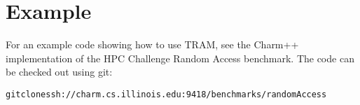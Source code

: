 \section{Example}

For an example code showing how to use TRAM, see the Charm++ implementation of
the HPC Challenge Random Access benchmark. The code can be checked out using
git:

\begin{alltt}
git clone  ssh://charm.cs.illinois.edu:9418/benchmarks/randomAccess
\end{alltt}

\thispagestyle{empty}
\pagestyle{empty}

%
